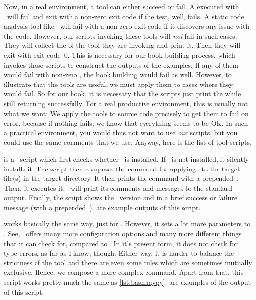 Now, in a real environment, a tool can either succeed or fail.
A  executed with \pytest\ will fail and exit with a non-zero exit code if the test, well, fails.
A static code analysis tool like \ruff\ will fail with a non-zero exit code if it discovers any issue with the code.
However, our scripts invoking these tools will \emph{not} fail in such cases.
They will collect the  of the tool they are invoking and print it.
Then they will exit with exit code~0.
This is necessary for our book building process, which invokes these scripts to construct the outputs of the examples.
If any of them would fail with non-zero , the book building would fail as well.
However, to illustrate that the tools are useful, we must apply them to cases where they would fail.
So for our book, it is necessary that the scripts just print the  while still returning successfully.
For a real productive environment, this is usually not what we want:
We apply the tools to source code precisely to get them to fail on error, because if nothing fails, we know that everything seems to be OK.
In such a practical environment, you would thus not want to use \emph{our} scripts, but you could use the same comments that we use.
Anyway, here is the list of tool scripts.

 is a \bash\ script which first checks whether \mypy\ is installed.
If \mypy\ is not installed, it silently installs it.
The script then composes the command for applying \mypy\ to the target file(s) in the target directory.
It then prints the command with a prepended~\expandafter\textil{\$}.
Then, it executes it.
\mypy\ will print its comments and messages to the standard output.
Finally, the script shows the \mypy\ version and  in a brief success or failure message (with a prepended~\expandafter\textil{\#}).
 are example outputs of this script.

 works basically the same way, just for \ruff.
However, it sets a lot more parameters to \ruff.
See, \ruff\ offers many more configuration options and many more different things that it can check for, compared to \mypy.
In it's present form, it does not check for type errors, as far as I know, though.
Either way, it is harder to balance the strictness of the tool and there are even some rules which are sometimes mutually exclusive.
Hence, we compose a more complex command.
Apart from that, this script works pretty much the same as \cref{lst:bash:mypy}.
 are examples of the output of this script.

